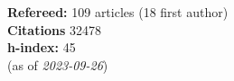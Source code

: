 \textbf{Refereed:} 109 articles (18 first author)\\\textbf{Citations} 32478\\\textbf{h-index:} 45\\(as of \textit{2023-09-26})